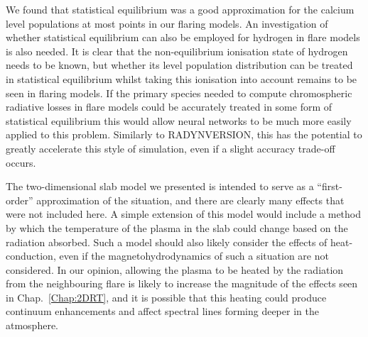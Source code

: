 We found that statistical equilibrium was a good approximation for the calcium level populations at most points in our flaring models.
An investigation of whether statistical equilibrium can also be employed for hydrogen in flare models is also needed.
It is clear that the non-equilibrium ionisation state of hydrogen needs to be known, but whether its level population distribution can be treated in statistical equilibrium whilst taking this ionisation into account remains to be seen in flaring models.
If the primary species needed to compute chromospheric radiative losses in flare models could be accurately treated in some form of statistical equilibrium this would allow neural networks to be much more easily applied to this problem.
Similarly to RADYNVERSION, this has the potential to greatly accelerate this style of simulation, even if a slight accuracy trade-off occurs.

The two-dimensional slab model we presented is intended to serve as a ``first-order'' approximation of the situation, and there are clearly many effects that were not included here.
A simple extension of this model would include a method by which the temperature of the plasma in the slab could change based on the radiation absorbed.
Such a model should also likely consider the effects of heat-conduction, even if the magnetohydrodynamics of such a situation are not considered.
In our opinion, allowing the plasma to be heated by the radiation from the neighbouring flare is likely to increase the magnitude of the effects seen in Chap.~\ref{Chap:2DRT}, and it is possible that this heating could produce continuum enhancements and affect spectral lines forming deeper in the atmosphere.

